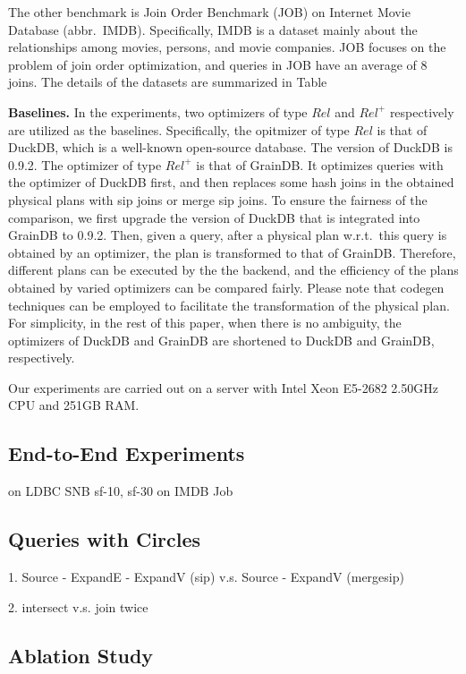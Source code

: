 The other benchmark is Join Order Benchmark (JOB) on Internet Movie Database (abbr.~IMDB).
Specifically, IMDB is a dataset mainly about the relationships among movies, persons, and movie companies.
JOB focuses on the problem of join order optimization, and queries in JOB have an average of 8 joins.
The details of the datasets are summarized in Table

\textbf{Baselines. }
In the experiments, two optimizers of type $Rel$ and $Rel^+$ respectively are utilized as the baselines.
Specifically, the opitmizer of type $Rel$ is that of DuckDB, which is a well-known open-source database.
The version of DuckDB is 0.9.2.
The optimizer of type $Rel^+$ is that of GrainDB.
It optimizes queries with the optimizer of DuckDB first, and then replaces some hash joins in the obtained physical plans with sip joins or merge sip joins.
To ensure the fairness of the comparison, we first upgrade the version of DuckDB that is integrated into GrainDB to 0.9.2.
Then, given a query, after a physical plan w.r.t.~this query is obtained by an optimizer, the plan is transformed to that of GrainDB.
Therefore, different plans can be executed by the the backend, and the efficiency of the plans obtained by varied optimizers can be compared fairly.
Please note that codegen techniques can be employed to facilitate the transformation of the physical plan.
For simplicity, in the rest of this paper, when there is no ambiguity, the optimizers of DuckDB and GrainDB are shortened to DuckDB and GrainDB, respectively.

Our experiments are carried out on a server with Intel Xeon E5-2682 2.50GHz CPU and 251GB RAM.

\subsection{End-to-End Experiments}
\label{sec:experiment-e2e}

on LDBC SNB sf-10, sf-30
on IMDB Job

\subsection{Queries with Circles}
\label{sec:experiment-circle}

1. Source - ExpandE - ExpandV (sip) v.s. Source - ExpandV (mergesip)

2. intersect v.s. join twice


\subsection{Ablation Study}
\label{sec:experiment-ablation}


